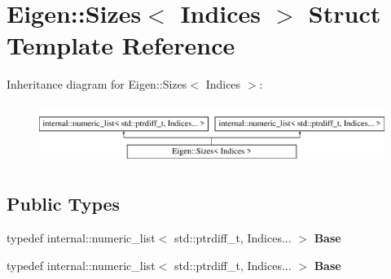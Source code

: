 \hypertarget{struct_eigen_1_1_sizes}{}\section{Eigen\+:\+:Sizes$<$ Indices $>$ Struct Template Reference}
\label{struct_eigen_1_1_sizes}
Inheritance diagram for Eigen\+:\+:Sizes$<$ Indices $>$\+:\begin{figure}[H]
\begin{center}
\leavevmode
\includegraphics[height=1.964912cm]{struct_eigen_1_1_sizes}
\end{center}
\end{figure}
\subsection*{Public Types}
\begin{DoxyCompactItemize}
\item 
\mbox{\label{struct_eigen_1_1_sizes_a6aa0bfb2c814c092942c5b8f42cc6ab4}} 
typedef internal\+::numeric\+\_\+list$<$ std\+::ptrdiff\+\_\+t, Indices... $>$ {\bfseries Base}
\item 
\mbox{\label{struct_eigen_1_1_sizes_a6aa0bfb2c814c092942c5b8f42cc6ab4}} 
typedef internal\+::numeric\+\_\+list$<$ std\+::ptrdiff\+\_\+t, Indices... $>$ {\bfseries Base}
\end{DoxyCompactItemize}
